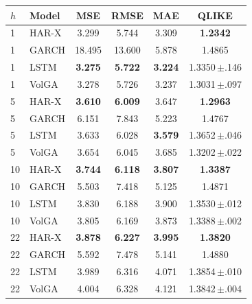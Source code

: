 \begin{tabular}{llcccc}
\toprule
$h$ & Model & MSE & RMSE & MAE & QLIKE \\
\midrule
1 & HAR-X & 3.299 & 5.744 & 3.309 & \textbf{1.2342} \\
1 & GARCH & 18.495 & 13.600 & 5.878 & 1.4865 \\
1 & LSTM & \textbf{3.275} & \textbf{5.722} & \textbf{3.224} & 1.3350\,$\pm$.146 \\
1 & VolGA & 3.278 & 5.726 & 3.237 & 1.3031\,$\pm$.097 \\
\midrule
5 & HAR-X & \textbf{3.610} & \textbf{6.009} & 3.647 & \textbf{1.2963} \\
5 & GARCH & 6.151 & 7.843 & 5.223 & 1.4767 \\
5 & LSTM & 3.633 & 6.028 & \textbf{3.579} & 1.3652\,$\pm$.046 \\
5 & VolGA & 3.654 & 6.045 & 3.685 & 1.3202\,$\pm$.022 \\
\midrule
10 & HAR-X & \textbf{3.744} & \textbf{6.118} & \textbf{3.807} & \textbf{1.3387} \\
10 & GARCH & 5.503 & 7.418 & 5.125 & 1.4871 \\
10 & LSTM & 3.830 & 6.188 & 3.900 & 1.3530\,$\pm$.012 \\
10 & VolGA & 3.805 & 6.169 & 3.873 & 1.3388\,$\pm$.002 \\
\midrule
22 & HAR-X & \textbf{3.878} & \textbf{6.227} & \textbf{3.995} & \textbf{1.3820} \\
22 & GARCH & 5.592 & 7.478 & 5.141 & 1.4880 \\
22 & LSTM & 3.989 & 6.316 & 4.071 & 1.3854\,$\pm$.010 \\
22 & VolGA & 4.004 & 6.328 & 4.121 & 1.3842\,$\pm$.004 \\
\bottomrule
\end{tabular}
